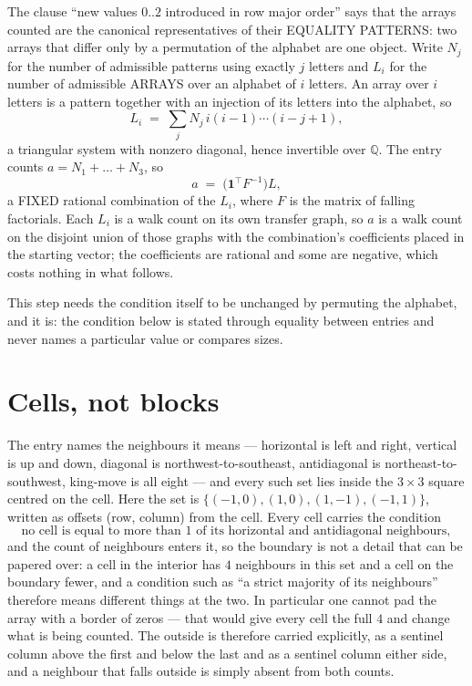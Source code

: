 \documentclass[11pt,a4paper]{article}
\theoremstyle{plain}
\theoremstyle{definition}
\begin{document}
The clause ``new values $0..2$ introduced in row major order'' says that the arrays
counted are the canonical representatives of their EQUALITY PATTERNS: two arrays that differ
only by a permutation of the alphabet are one object. Write $N_j$ for the number of admissible
patterns using exactly $j$ letters and $L_i$ for the number of admissible ARRAYS over an
alphabet of $i$ letters. An array over $i$ letters is a pattern together with an injection of
its letters into the alphabet, so
\[
L_i\;=\;\sum_{j}N_j\,i(i-1)\cdots(i-j+1),
\]
a triangular system with nonzero diagonal, hence invertible over $\mathbb{Q}$. The entry
counts $a=N_1+\dots+N_{3}$, so
\[
a\;=\;\bigl(\mathbf{1}^{\!\top}F^{-1}\bigr)L ,
\]
a FIXED rational combination of the $L_i$, where $F$ is the matrix of falling factorials.
Each $L_i$ is a walk count on its own transfer graph, so $a$ is a walk count on the disjoint
union of those graphs with the combination's coefficients placed in the starting vector; the
coefficients are rational and some are negative, which costs nothing in what follows.

This step needs the condition itself to be unchanged by permuting the alphabet, and it is:
the condition below is stated through equality between entries and never names a particular
value or compares sizes.

\section{Cells, not blocks}

The entry names the neighbours it means --- horizontal is left and right, vertical is up and
down, diagonal is northwest-to-southeast, antidiagonal is northeast-to-southwest, king-move is
all eight --- and every such set lies inside the $3\times3$ square centred on the cell. Here
the set is $\{(-1,0), (1,0), (1,-1), (-1,1)\}$, written as offsets (row, column) from the cell. Every cell carries
the condition
\[
\text{no cell is equal to more than 1 of its horizontal and antidiagonal neighbours},
\]
and the count of neighbours enters it, so the boundary is not a detail that can be papered
over: a cell in the interior has $4$ neighbours in this set and a cell on the boundary
fewer, and a condition such as ``a strict majority of its neighbours'' therefore means
different things at the two. In particular one cannot pad the array with a border of zeros ---
that would give every cell the full $4$ and change what is being counted. The outside is
therefore carried
explicitly, as a sentinel column above the first and below the last and as a sentinel column
either side, and a neighbour that falls outside is simply absent from both counts.
\end{document}
